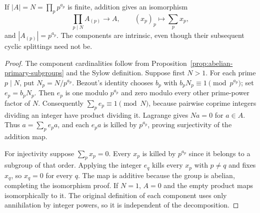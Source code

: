 \begin{theorem}\label{thm:abelian-primary-decomposition}
If $|A|=N=\prod_p p^{a_p}$ is finite, addition gives an isomorphism
\[
 \prod_{p\mid N} A_{(p)}\longrightarrow A,
 \qquad (x_p)_p\longmapsto\sum_p x_p,
\]
and $|A_{(p)}|=p^{a_p}$. The components are intrinsic, even though their subsequent cyclic splittings need not be.
\end{theorem}
\begin{proof}
The component cardinalities follow from Proposition~\ref{prop:abelian-primary-subgroups} and the Sylow definition. Suppose first $N>1$. For each prime $p\mid N$, put $N_p=N/p^{a_p}$. Bezout's identity chooses $b_p$ with $b_pN_p\equiv1\pmod{p^{a_p}}$; set $e_p=b_pN_p$. Then $e_p$ is one modulo $p^{a_p}$ and zero modulo every other prime-power factor of $N$. Consequently $\sum_p e_p\equiv1\pmod N$, because pairwise coprime integers dividing an integer have product dividing it. Lagrange gives $Na=0$ for $a\in A$. Thus
$a=\sum_p e_pa$, and each $e_pa$ is killed by $p^{a_p}$, proving surjectivity of the addition map.

For injectivity suppose $\sum_px_p=0$. Every $x_p$ is killed by $p^{a_p}$ since it belongs to a subgroup of that order. Applying the integer $e_q$ kills every $x_p$ with $p\ne q$ and fixes $x_q$, so $x_q=0$ for every $q$. The map is additive because the group is abelian, completing the isomorphism proof. If $N=1$, $A=0$ and the empty product maps isomorphically to it. The original definition of each component uses only annihilation by integer powers, so it is independent of the decomposition.
\end{proof}

